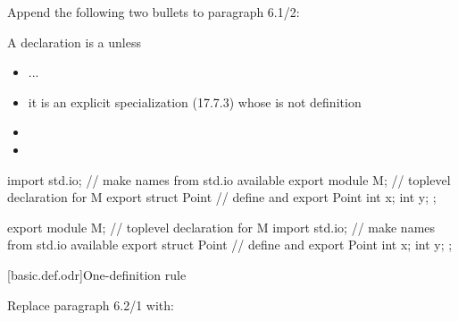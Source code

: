 \noindent
Append the following two bullets to paragraph 6.1/2:
\begin{std.txt}
  \resetalinea[1]
  \alinea
  A declaration is a  unless
  \begin{itemize}
    \item ...
    \item it is an explicit specialization (17.7.3) whose 
    is not definition\added{,}
    \color{addclr}
    \item {}
    \item \begin{before}\end{before}
  \end{itemize}
  \color{addclr}
\enterexample
\begin{before}\color{addclr}
\begin{codeblock}
    import std.io;                  // make names from std.io available
    export module M;                // toplevel declaration for M
    export struct Point {           // define and export Point
      int x;
      int y;
    };
\end{codeblock}
\end{before}\begin{after}\color{addclr}
\begin{codeblock}
    export module M;                // toplevel declaration for M
    import std.io;                  // make names from std.io available
    export struct Point {           // define and export Point
      int x;
      int y;
    };
\end{codeblock}
\end{after}
\exitexample
\end{std.txt}


[basic.def.odr]{One-definition rule}

Replace paragraph 6.2/1 with:
\begin{std.txt}\color{addclr}
  \resetalinea[0]
  \alinea
  \begin{before}
  \end{before}
  \begin{after}
  \end{after}
\end{std.txt}

